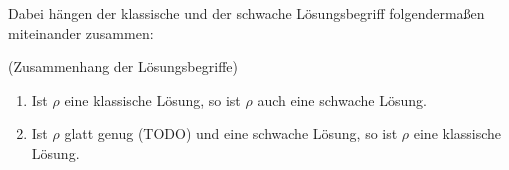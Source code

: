 Dabei hängen der klassische und der schwache Lösungsbegriff folgendermaßen miteinander zusammen:
\begin{Lemma}(Zusammenhang der Lösungsbegriffe)
	
	\begin{enumerate}[label=(\alph*)]
		\item Ist $ \rho $ eine klassische Lösung, so ist $ \rho $ auch eine schwache Lösung.
		\item Ist $ \rho $ glatt genug (TODO) und eine schwache Lösung, so ist $ \rho $ eine klassische Lösung. 
	\end{enumerate}
\end{Lemma}

